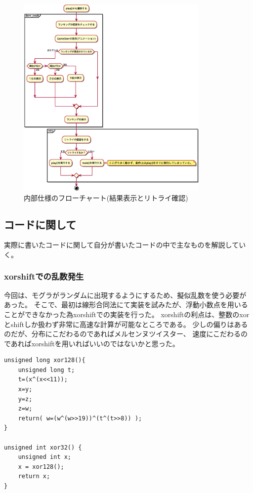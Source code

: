 \documentclass[11pt,a4j]{jsarticle}
\makeatletter
\newcommand{\figcaption}[1]{\def\@captype{figure}\caption{#1}}
\makeatother
\begin{document}
\begin{figure}[H]
  \centering
  \includegraphics[height=100mm]{img/mogura_result.eps}
  \figcaption{内部仕様のフローチャート(結果表示とリトライ確認)}
  \label{fig:flow3}
\end{figure}

\subsection{コードに関して}
\label{sub:コードに関して}

実際に書いたコードに関して自分が書いたコードの中で主なものを解説していく。

\subsubsection{xorshiftでの乱数発生}
\label{subs:xorshiftでの乱数発生}

今回は、モグラがランダムに出現するようにするため、擬似乱数を使う必要があった。
そこで、最初は線形合同法にて実装を試みたが、浮動小数点を用いることができなかった為xorshiftでの実装を行った。
xorshiftの利点は、整数のxorとshiftしか扱わず非常に高速な計算が可能なところである。
少しの偏りはあるのだが、分布にこだわるのであればメルセンヌツイスター、
速度にこだわるのであればxorshiftを用いればいいのではないかと思った。

\begin{lstlisting}[basicstyle=\ttfamily\footnotesize, caption=xorshiftでの擬似乱数]
unsigned long xor128(){
	unsigned long t;
	t=(x^(x<<11));
	x=y;
	y=z;
	z=w;
	return( w=(w^(w>>19))^(t^(t>>8)) );
}

unsigned int xor32() {
	unsigned int x;
	x = xor128();
	return x;
}
\end{lstlisting}
\end{document}
